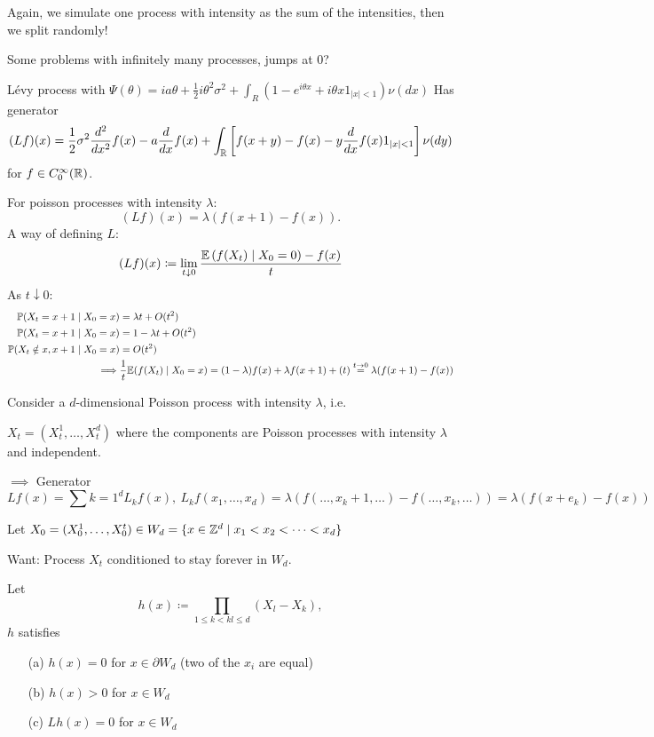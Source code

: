 Again, we simulate one process with intensity as the sum of the intensities, then we split randomly!

\begin{aremark}
    Some problems with infinitely many processes, jumps at 0?
\end{aremark}


\begin{aremark}
    Lévy process with $\Psi(\theta)=ia\theta+\frac{1}{2}i\theta^2\sigma^2+\int_{R}(1-e^{i\theta x}+i\theta x1_{|x|<1})\nu(dx)$
    Has generator 
    \[(L f)(x)=\frac{1}{2}\sigma^2\frac{d^2}{dx^2}f(x)-a\frac{d}{dx}f(x)+\int_{\mathbb{R}}\left[f(x+y)-f(x)-y\frac{d}{dx}f(x)1_{|x|<1}\right]\nu(dy)\]
    for $f\in C_0^\infty(\mathbb{R})$.
\end{aremark}

For poisson processes with intensity $\lambda$:
\[(L f)(x)=\lambda(f(x+1)-f(x)).\]
A way of defining $L$:
\[(Lf)(x)\coloneqq \lim_{t\downarrow 0}\frac{\mathbb{E}\left(f(X_t)\mid X_0=0\right)-f(x)}{t}\]
As $t\downarrow 0$:
\begin{align*}
    \mathbb{P}(X_t=x+1\mid X_0=x)&=\lambda t + O(t^2)\\
    \mathbb{P}(X_t=x+1\mid X_0=x)&=1- \lambda t + O(t^2)\\
    \mathbb{P}(X_t\notin{x,x+1}\mid X_0=x)&=O(t^2)\\
    \implies & \frac{1}{t}\mathbb{E}(f(X_t)\mid X_0=x)=(1-\lambda)f(x)+\lambda f(x+1)+(t)\stackrel{t\to 0}{=}\lambda(f(x+1)-f(x))
\end{align*}

Consider a $d$-dimensional Poisson process with intensity $\lambda$, i.e. 

$X_t=(X_t^1,\dots,X_t^d)$ where the components are Poisson processes with intensity $\lambda$ and independent.

$\implies$ Generator 
\[Lf(x)=\sum{k=1}^d L_kf(x),\ L_k f(x_1,\dots,x_d)=\lambda(f(\dots,x_k+1,\dots)-f(\dots,x_k,\dots))=\lambda(f(x+e_k)-f(x))\]

Let $X_0=(X_0^1,\dots,X_0^t)\in W_d=\{x\in \mathbb{Z}^d\mid x_1<x_2<\dots<x_d\}$

Want: Process $X_t$ conditioned to stay forever in $W_d$.


\begin{lemma}\label{lem:4.10}
    Let \[h(x)\coloneqq \prod_{1\leq k<kl\leq d} (X_l-X_k),\]
    $h$ satisfies 
    \begin{enumerate}
        \item[(a)] $h(x)=0$ for $x\in \partial W_d$ (two of the $x_i$ are equal)
        \item[(b)] $h(x)>0$  for $x \in W_d$
        \item[(c)] $Lh(x)=0$ for $x\in W_d$  
    \end{enumerate}
\end{lemma}

